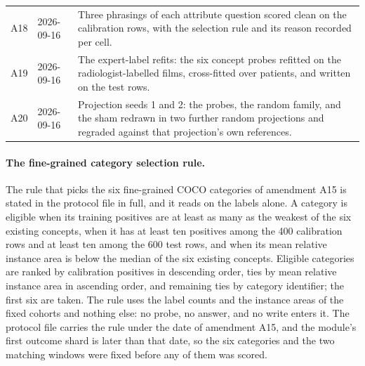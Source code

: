 \documentclass{article}
\providecommand{\DIFaddendFL}{} %
\DeclareRobustCommand{\DIFaddendFL}{\DIFOaddendFL \let\includegraphics\DIFOincludegraphics} %
\begin{document}
\begin{table}[h]
{\begin{tabular}{ll>{\raggedright\arraybackslash}p{}}
A18 & 2026-09-16 & Three phrasings of each attribute question scored clean on the calibration rows, with the selection rule and its reason recorded per cell. \\
A19 & 2026-09-16 & The expert-label refits: the six concept probes refitted on the radiologist-labelled films, cross-fitted over patients, and written on the test rows. \\
A20 & 2026-09-16 & Projection seeds 1 and 2: the probes, the random family, and the sham redrawn in two further random projections and regraded against that projection's own references. \\
\bottomrule
\end{tabular}}
\DIFaddendFL \end{table}

\FloatBarrier

\paragraph{The fine-grained category selection rule.} The rule that picks the six fine-grained COCO categories of amendment A15 is stated in the protocol file in full, and it reads on the labels alone. A category is eligible when its training positives are at least as many as the weakest of the six existing concepts, when it has at least ten positives among the 400 calibration rows and at least ten among the 600 test rows, and when its mean relative instance area is below the median of the six existing concepts. Eligible categories are ranked by calibration positives in descending order, ties by mean relative instance area in ascending order, and remaining ties by category identifier; the first six are taken. The rule uses the label counts and the instance areas of the fixed cohorts and nothing else: no probe, no answer, and no write enters it. The protocol file carries the rule under the date of amendment A15, and the module's first outcome shard is later than that date, so the six categories and the two matching windows were fixed before any of them was scored.
\end{document}

